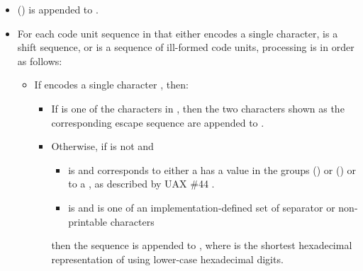 \documentclass{wg21}
\begin{document}
\begin{itemize}
    \item
     () is appended to .

    \item
    For each code unit sequence  in  that either
    encodes a single character,
    is a shift sequence, or
    is a sequence of ill-formed code units,
    processing is in order as follows:

    \begin{itemize}
        \item
        If  encodes a single character , then:

        \begin{itemize}
            \item
            If  is one of the characters in ,
            then the two characters shown as the corresponding escape sequence
            are appended to .

            \item
            Otherwise, if  is not  and

            \begin{itemize}
                \item
                 is  and
                 corresponds to either
                a  
                has a value in the groups  () or  () or to
                a  ,
                as described by  UAX \#44 .

                \item
                 is  and
                 is one of an implementation-defined set
                of separator or non-printable characters
            \end{itemize}

            then the sequence 
            is appended to ,
            where 
            is the shortest hexadecimal representation
            of  using lower-case hexadecimal digits.


\end{itemize}
\end{itemize}
\end{itemize}
\end{document}

